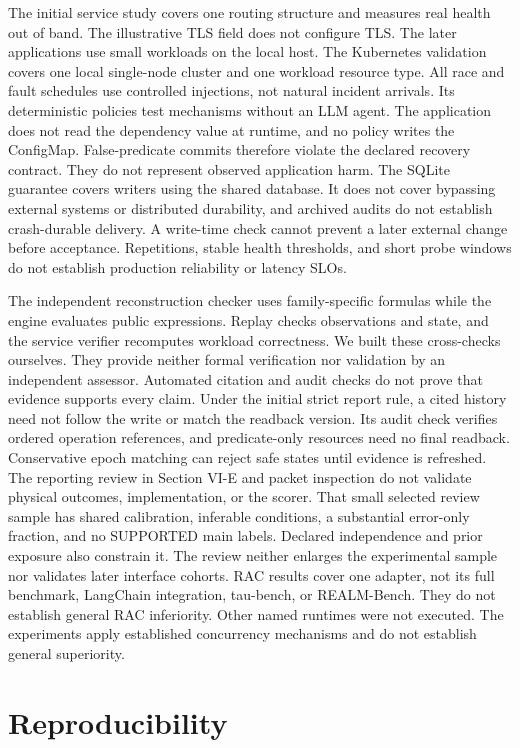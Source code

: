 \documentclass[conference,10pt]{IEEEtran}
\begin{document}
The initial service study covers one routing structure and measures real health out of band. The illustrative TLS field does not configure TLS. The later applications use small workloads on the local host. The Kubernetes validation covers one local single-node cluster and one workload resource type. All race and fault schedules use controlled injections, not natural incident arrivals. Its deterministic policies test mechanisms without an LLM agent. The application does not read the dependency value at runtime, and no policy writes the ConfigMap. False-predicate commits therefore violate the declared recovery contract. They do not represent observed application harm. The SQLite guarantee covers writers using the shared database. It does not cover bypassing external systems or distributed durability, and archived audits do not establish crash-durable delivery. A write-time check cannot prevent a later external change before acceptance. Repetitions, stable health thresholds, and short probe windows do not establish production reliability or latency SLOs.

The independent reconstruction checker uses family-specific formulas while the engine evaluates public expressions. Replay checks observations and state, and the service verifier recomputes workload correctness. We built these cross-checks ourselves. They provide neither formal verification nor validation by an independent assessor. Automated citation and audit checks do not prove that evidence supports every claim. Under the initial strict report rule, a cited history need not follow the write or match the readback version. Its audit check verifies ordered operation references, and predicate-only resources need no final readback. Conservative epoch matching can reject safe states until evidence is refreshed. The reporting review in Section VI-E and packet inspection do not validate physical outcomes, implementation, or the scorer. That small selected review sample has shared calibration, inferable conditions, a substantial error-only fraction, and no SUPPORTED main labels. Declared independence and prior exposure also constrain it. The review neither enlarges the experimental sample nor validates later interface cohorts. RAC results cover one adapter, not its full benchmark, LangChain integration, tau-bench, or REALM-Bench. They do not establish general RAC inferiority. Other named runtimes were not executed. The experiments apply established concurrency mechanisms and do not establish general superiority.

\section{Reproducibility}
\end{document}
